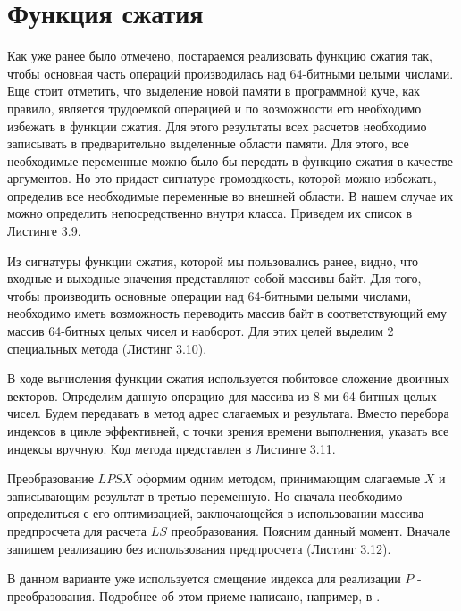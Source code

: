 \section{Функция сжатия}
\par
Как уже ранее было отмечено, постараемся реализовать функцию сжатия так, чтобы основная часть операций производилась над 64-битными целыми числами. Еще стоит отметить, что выделение новой памяти в программной куче, как правило, является трудоемкой операцией и по возможности его необходимо избежать в функции сжатия. Для этого результаты всех расчетов необходимо записывать в предварительно выделенные области памяти. Для этого, все необходимые переменные можно было бы передать в функцию сжатия в качестве аргументов. Но это придаст сигнатуре громоздкость, которой можно избежать, определив все необходимые переменные во внешней области. В нашем случае их можно определить непосредственно внутри класса. Приведем их список в Листинге 3.9.

\par
Из сигнатуры функции сжатия, которой мы пользовались ранее, видно, что входные и выходные значения представляют собой массивы байт. Для того, чтобы производить основные операции над 64-битными целыми числами, необходимо иметь возможность переводить массив байт в соответствующий ему массив 64-битных целых чисел и наоборот. Для этих целей выделим 2 специальных метода (Листинг 3.10).

\par
В ходе вычисления функции сжатия используется побитовое сложение двоичных векторов. Определим данную операцию для массива из 8-ми 64-битных целых чисел. Будем передавать в метод адрес слагаемых и результата. Вместо перебора индексов в цикле эффективней, с точки зрения времени выполнения, указать все индексы вручную. Код метода представлен в Листинге 3.11.

Преобразование $LPSX$ оформим одним методом, принимающим слагаемые $X$ и записывающим результат в третью переменную. Но сначала необходимо определиться с его оптимизацией, заключающейся в использовании массива предпросчета для расчета $LS$ преобразования.
Поясним данный момент. Вначале запишем реализацию без использования предпросчета (Листинг 3.12).

\par В данном варианте уже используется смещение индекса для реализации $P$ - преобразования. Подробнее об этом приеме написано, например, в \cite{LebedevHash}.
